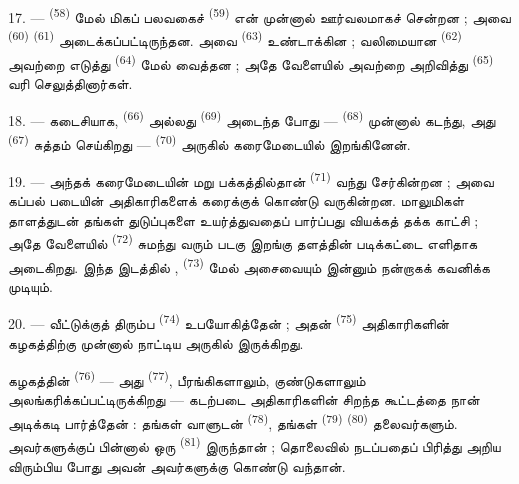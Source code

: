 17. ---  \textsuperscript{(58)} மேல் மிகப் பலவகைச்
 \textsuperscript{(59)} என் முன்னால் ஊர்வலமாகச்
சென்றன ; அவை  \textsuperscript{(60)}
 \textsuperscript{(61)} அடைக்கப்பட்டிருந்தன.
அவை   \textsuperscript{(63)}
உண்டாக்கின ; வலிமையான  \textsuperscript{(62)}
அவற்றை எடுத்து  \textsuperscript{(64)} மேல்
வைத்தன ; அதே வேளையில்  அவற்றை
அறிவித்து  \textsuperscript{(65)} வரி
செலுத்தினார்கள்.

18. --- கடைசியாக,  \textsuperscript{(66)}
அல்லது  \textsuperscript{(69)} அடைந்த
போது —  \textsuperscript{(68)}
முன்னால் கடந்து, அது  \textsuperscript{(67)} சுத்தம்
செய்கிறது —  \textsuperscript{(70)} அருகில்
கரைமேடையில் இறங்கினேன்.

19. --- அந்தக் கரைமேடையின் மறு பக்கத்தில்தான் 
\textsuperscript{(71)} வந்து சேர்கின்றன ; அவை கப்பல் படையின்
அதிகாரிகளைக் கரைக்குக் கொண்டு வருகின்றன. மாலுமிகள் தாளத்துடன்
தங்கள் துடுப்புகளை உயர்த்துவதைப் பார்ப்பது வியக்கத் தக்க காட்சி ;
அதே வேளையில்  \textsuperscript{(72)} சுமந்து வரும் படகு
இறங்கு தளத்தின் படிக்கட்டை எளிதாக அடைகிறது. இந்த இடத்தில்
,  \textsuperscript{(73)} மேல்
  அசைவையும் இன்னும் நன்றாகக்
கவனிக்க முடியும்.

\VUsaut{3.0mm}
\VUsaut{3.0mm}

20. --- வீட்டுக்குத் திரும்ப 
\textsuperscript{(74)} உபயோகித்தேன் ; அதன் 
\textsuperscript{(75)} அதிகாரிகளின் கழகத்திற்கு முன்னால் நாட்டிய
 அருகில் இருக்கிறது.

கழகத்தின்  \textsuperscript{(76)} — அது
 \textsuperscript{(77)}, பீரங்கிகளாலும்,
குண்டுகளாலும் அலங்கரிக்கப்பட்டிருக்கிறது — கடற்படை அதிகாரிகளின்
சிறந்த கூட்டத்தை நான் அடிக்கடி பார்த்தேன் : தங்கள் வாளுடன்
 \textsuperscript{(78)}, தங்கள்
 
\textsuperscript{(79)}  \textsuperscript{(80)}
தலைவர்களும். அவர்களுக்குப் பின்னால் ஒரு 
\textsuperscript{(81)} இருந்தான் ; தொலைவில் நடப்பதைப் பிரித்து அறிய
விரும்பிய போது அவன் அவர்களுக்கு  கொண்டு
வந்தான்.

